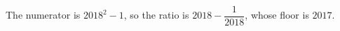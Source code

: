 The numerator is $2018^2-1$, so the ratio is $2018-\dfrac{1}{2018}$, whose floor is $\boxed{2017}$.
